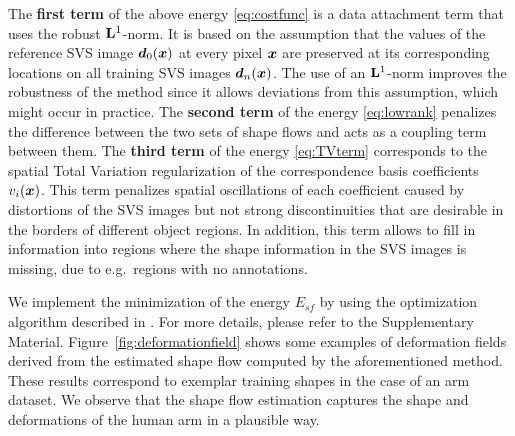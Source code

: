 The \textbf{first term} of the above energy \eqref{eq:costfunc} is a data attachment term
that uses the robust $\mathbf{L}^1$-norm.  It is based on the assumption that the values of the reference SVS image $\bm{d}_0(\boldsymbol{x})$ at every pixel $\boldsymbol{x}$ are preserved at its corresponding locations on all training SVS images $\bm{d}_n(\boldsymbol{x})$. The use of an $\mathbf{L}^1$-norm improves the robustness of the method since it allows deviations from this assumption, which might occur in practice.
The \textbf{second term} of the energy \eqref{eq:lowrank} penalizes the difference between the two sets  of shape flows and acts as a coupling term between them.
The \textbf{third term} of the energy \eqref{eq:TVterm} corresponds to the spatial Total Variation regularization \cite{rudin92} of
the correspondence basis coefficients $v_i(\boldsymbol{x})$.
This term penalizes spatial oscillations of each coefficient caused by distortions of the SVS images but not strong discontinuities that are desirable in the borders of different object regions. In addition, this term allows to fill in information into regions where the shape information in the SVS images is missing, due to e.g.~regions with no annotations.

We implement the minimization of the energy $E_{sf}$ by using the optimization algorithm described in \cite{Garg:2013hu}. For more details, please refer to the Supplementary Material.
%
Figure~\ref{fig:deformationfield} shows some examples of deformation fields derived from the estimated shape flow computed by the aforementioned method. These results correspond to exemplar training shapes in the case of an arm dataset. We observe that the shape flow estimation captures the shape and deformations of the human arm in a plausible way.








